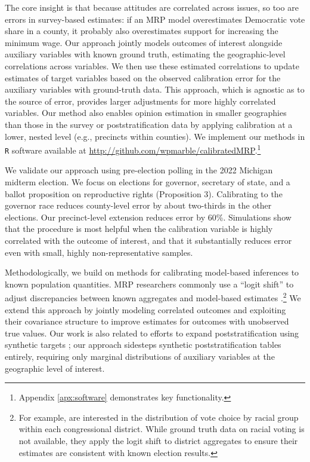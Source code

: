 The core insight is that because attitudes are correlated across issues, so too are errors in survey-based estimates: if an MRP model overestimates Democratic vote share in a county, it probably also overestimates support for increasing the minimum wage.
Our approach jointly models outcomes of interest alongside auxiliary variables with known ground truth, estimating the geographic-level correlations across variables.
We then use these estimated correlations to update estimates of target variables based on the observed calibration error for the auxiliary variables with ground-truth data.
This approach, which is agnostic as to the source of error, provides larger adjustments for more highly correlated variables.
Our method also enables opinion estimation in smaller geographies than those in the survey or poststratification data by applying calibration at a lower, nested level (e.g., precincts within counties).
We implement our methods in \texttt{R} software available at \url{http://github.com/wpmarble/calibratedMRP}.\footnote{Appendix \ref{apx:software} demonstrates key functionality.}

We validate our approach using pre-election polling in the 2022 Michigan midterm election.
We focus on elections for governor, secretary of state, and a ballot proposition on reproductive rights (Proposition 3).
Calibrating to the governor race reduces county-level error by about two-thirds in the other elections.
Our precinct-level extension reduces error by 60\%.
Simulations show that the procedure is most helpful when the calibration variable is highly correlated with the outcome of interest, and that it substantially reduces error even with small, highly non-representative samples.

Methodologically, we build on methods for calibrating model-based inferences to known population quantities.
MRP researchers commonly use a ``logit shift'' to adjust discrepancies between known aggregates and model-based estimates \citep{GG:2013,RMO:2023}.\footnote{For example, \citet{Kuriwaki2023} are interested in the distribution of vote choice by racial group within each congressional district. While ground truth data on racial voting is not available, they apply the logit shift to district aggregates to ensure their estimates are consistent with known election results.}
We extend this approach by jointly modeling correlated outcomes and exploiting their covariance structure to improve estimates for outcomes with unobserved true values.
Our work is also related to efforts to expand poststratification using synthetic targets \citep{LW:2017}; our approach sidesteps synthetic poststratification tables entirely, requiring only marginal distributions of auxiliary variables at the geographic level of interest.

